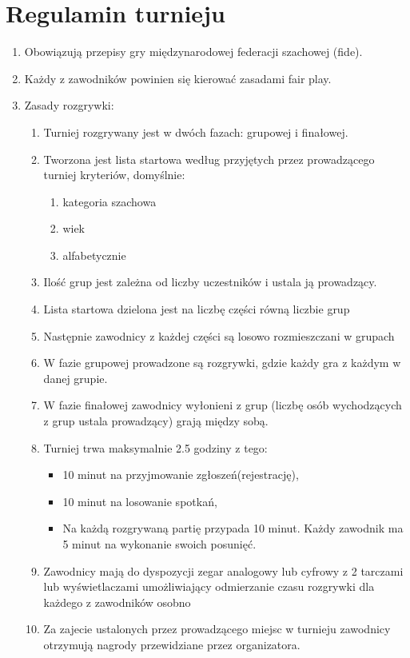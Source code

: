 \section{Regulamin turnieju}
\begin{enumerate}
\item Obowiązują przepisy gry międzynarodowej federacji szachowej (fide).
\item Każdy z zawodników powinien się kierować zasadami fair play.
\item Zasady rozgrywki:
\begin{enumerate}
\item Turniej rozgrywany jest w dwóch fazach: grupowej i finałowej.\\
\item Tworzona jest lista startowa według przyjętych przez prowadzącego turniej kryteriów, domyślnie:
\begin{enumerate}
\item kategoria szachowa 
\item wiek
\item alfabetycznie
\end{enumerate}
\item Ilość grup jest zależna od liczby uczestników i ustala ją prowadzący.
\item Lista startowa dzielona jest na liczbę części równą liczbie grup
\item Następnie zawodnicy z każdej części są losowo rozmieszczani w grupach
\item W fazie grupowej prowadzone są rozgrywki, gdzie każdy gra z każdym w danej grupie.
\item W fazie finałowej zawodnicy wyłonieni z grup (liczbę osób wychodzących z grup ustala prowadzący) grają między sobą.
\item Turniej trwa maksymalnie 2.5 godziny z tego:
\begin{itemize}
\item 10 minut na przyjmowanie zgłoszeń(rejestrację),
\item 10 minut na losowanie spotkań,
\item Na każdą rozgrywaną partię przypada 10 minut. Każdy zawodnik ma 5 minut na wykonanie swoich posunięć.
\end{itemize}
\item Zawodnicy mają do dyspozycji zegar analogowy lub cyfrowy z 2 tarczami lub wyświetlaczami umożliwiający odmierzanie czasu rozgrywki dla każdego z zawodników osobno
\item Za zajecie ustalonych przez prowadzącego miejsc w turnieju zawodnicy otrzymują nagrody przewidziane przez organizatora.

\end{enumerate}
\end{enumerate}
